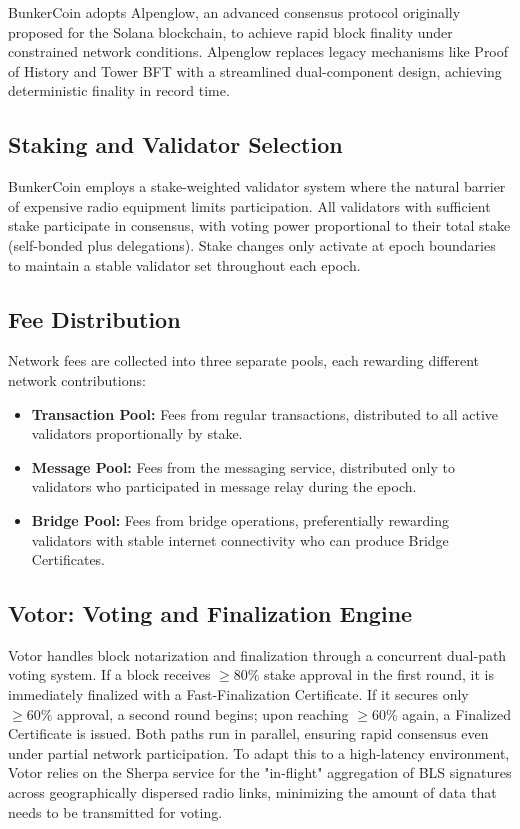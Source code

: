 \documentclass{article}
\begin{document}
BunkerCoin adopts Alpenglow, an advanced consensus protocol originally proposed for the Solana blockchain, to achieve rapid block finality under constrained network conditions. Alpenglow replaces legacy mechanisms like Proof of History and Tower BFT with a streamlined dual-component design, achieving deterministic finality in record time.

\subsection{Staking and Validator Selection}
\label{sec:staking}

BunkerCoin employs a stake-weighted validator system where the natural barrier of expensive radio equipment limits participation. All validators with sufficient stake participate in consensus, with voting power proportional to their total stake (self-bonded plus delegations). Stake changes only activate at epoch boundaries to maintain a stable validator set throughout each epoch.

\subsection{Fee Distribution}
\label{sec:fees}

Network fees are collected into three separate pools, each rewarding different network contributions:
\begin{itemize}
    \item \textbf{Transaction Pool:} Fees from regular transactions, distributed to all active validators proportionally by stake.
    \item \textbf{Message Pool:} Fees from the messaging service, distributed only to validators who participated in message relay during the epoch.
    \item \textbf{Bridge Pool:} Fees from bridge operations, preferentially rewarding validators with stable internet connectivity who can produce Bridge Certificates.
\end{itemize}

\subsection{Votor: Voting and Finalization Engine}

Votor handles block notarization and finalization through a concurrent dual-path voting system. If a block receives $\geq 80\%$ stake approval in the first round, it is immediately finalized with a Fast-Finalization Certificate. If it secures only $\geq 60\%$ approval, a second round begins; upon reaching $\geq 60\%$ again, a Finalized Certificate is issued. Both paths run in parallel, ensuring rapid consensus even under partial network participation. To adapt this to a high-latency environment, Votor relies on the Sherpa service for the "in-flight" aggregation of BLS signatures across geographically dispersed radio links, minimizing the amount of data that needs to be transmitted for voting.
\end{document}
